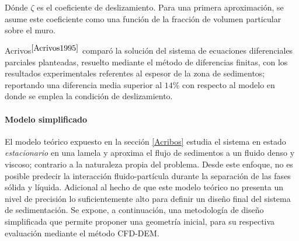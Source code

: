 \noindent
\justify

D\'onde $\zeta$ es el coeficiente de deslizamiento. Para una primera aproximaci\'on, se asume este coeficiente como una funci\'on de la fracci\'on de volumen particular sobre el muro.

\noindent
\justify

Acrivos$^{\cite{Acrivos1995}}$ compar\'o la soluci\'on del sistema de ecuaciones diferenciales parciales planteadas, resuelto mediante el m\'etodo de diferencias finitas, con los resultados experimentales referentes al espesor de la zona de sedimentos; reportando una diferencia media superior al $14 \%$ con respecto al modelo en donde se emplea la condici\'on de deslizamiento.

\paragraph{Modelo simplificado} \label{simplificado}

\noindent
\justify

El modelo te\'orico expuesto en la secci\'on \ref{Acribos} estudia el sistema en estado \textit{estacionario} en una lamela y aproxima el flujo de sedimentos a un fluido denso y viscoso; contrario a la naturaleza propia del problema. Desde este enfoque, no es posible predecir la interacci\'on fluido-part\'icula durante la separaci\'on de las fases s\'olida y l\'iquida. Adicional al hecho de que este modelo te\'orico no presenta un nivel de precisi\'on lo suficientemente alto para definir un dise\~no final del sistema de sedimentaci\'on. Se expone, a continuaci\'on, una metodolog\'ia de dise\~no simplificada que permite proponer una geometr\'ia inicial, para su respectiva evaluaci\'on mediante el m\'etodo CFD-DEM.








